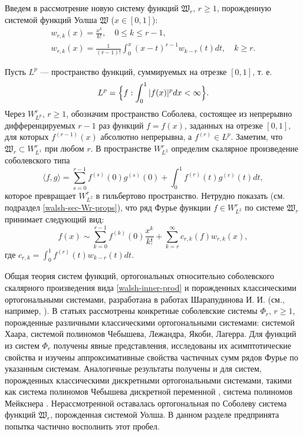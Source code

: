 Введем в рассмотрение новую систему функций $\mathfrak{W}_r$, $r \ge 1$, порожденную системой функций Уолша $\mathfrak{W}$ ($x \in [0,1]$):
\begin{gather}
\label{walsh-wrk-1}
w_{r,k}(x) = \frac{x^k}{k!}, \quad 0 \le k \le r-1,\\
\label{walsh-wrk-2}
w_{r,k}(x) = \frac{1}{(r-1)!}\int_{0}^{x}(x-t)^{r-1}w_{k-r}(t)dt, \quad k \ge r.
\end{gather}



Пусть $L^p$ --- пространство функций, суммируемых на отрезке $[0,1]$, т. е.
\begin{equation}
L^p=\Bigl\{
f: \int_{0}^{1}|f(x)|^pdx < \infty
\Bigr\}.
\end{equation}
Через $W_{L^p}^r$, $r \ge 1$, обозначим пространство Соболева, состоящее из непрерывно дифференцируемых $r-1$ раз функций $f=f(x)$, заданных на отрезке $[0,1]$, для которых $f^{(r-1)}(x)$ абсолютно непрерывна, а $f^{(r)}\in L^p$. Заметим, что $\mathfrak{W}_r \subset W_{L^1}^r$ при любом $r$. В пространстве $W_{L^2}^r$ определим скалярное произведение соболевского типа
\begin{equation}\label{walsh-inner-prod}
\langle f,g \rangle=\sum_{s=0}^{r-1}f^{(s)}(0)g^{(s)}(0)+\int_0^1 f^{(r)}(t)g^{(r)}(t)dt,
\end{equation}
которое превращает $W_{L^2}^r$ в гильбертово пространство.
Нетрудно показать (см. подраздел \ref{walsh-sec-Wr-props}), что ряд Фурье функции $f \in W_{L^2}^r$ по системе $\mathfrak{W}_r$ принимает следующий вид:
\begin{equation}\label{walsh-fourier-series-intro}
f(x) \sim \sum_{k=0}^{r-1}f^{(k)}(0)\frac{x^k}{k!}+
\sum_{k=r}^{\infty}c_{r,k}(f)w_{r,k}(x),
\end{equation}
где $c_{r,k}=\int_{0}^{1}f^{(r)}(t)w_{k-r}(t)dt$.

Общая теория систем функций, ортогональных относительно соболевского скалярного произведения вида \eqref{walsh-inner-prod} и порожденных классическими ортогональными системами, разработана в работах Шарапудинова И. И. (см., например, \cite{walsh-ShII-2018-IzvRan}). В статьях \cite{walsh-ShII-2018-IzvRan, walsh-ShII-2017-mz, walsh-ShII-2017-smj, walsh-ShII-2015-demi} рассмотрены конкретные соболевские системы $\Phi_r$, $r \ge 1$, порожденные различными классическими ортогональными системами: системой Хаара, системой полиномов Чебышева, Лежандра, Якоби, Лагерра. Для функций из систем $\Phi_r$ получены явные представления, исследованы их асимптотические свойства и изучены аппроксимативные свойства частичных сумм рядов Фурье по указанным системам. 
Аналогичные результаты получены и для систем, порожденных классическими дискретными ортогональными системами, такими как система полиномов Чебышева дискретной переменной \cite{walsh-ShII-2017-izvuz}, система полиномов Мейкснера \cite{walsh-ShII-meix-2016, walsh-Gadzh-2016-saratov}. Нерассмотренной оставалась ортогональная по Соболеву система функций $\mathfrak{W}_r$, порожденная системой Уолша. В данном разделе предпринята попытка частично восполнить этот пробел.

